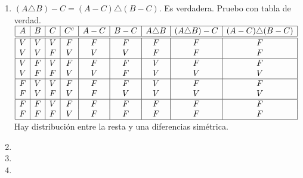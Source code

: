 \begin{enumerate}[label=\roman*)]
  \item $(A \triangle B) - C = (A-C) \triangle (B - C)$. Es verdadera. Pruebo con tabla de verdad.\\
        $
          \begin{array}{|c|c|c|c|c|c|c|c|c|}
            \hline
            A & B & C & C^c & A - C & B - C & A \triangle B & (A \triangle B) - C & (A - C) \triangle (B - C) \\
            \hline  \hline
            V & V & V & F   & F     & F     & F             & F                   & F                         \\
            V & V & F & V   & V     & V     & F             & F                   & F                         \\
            \hline
            V & F & V & F   & F     & F     & V             & F                   & F                         \\
            V & F & F & V   & V     & F     & V             & V                   & V                         \\
            \hline
            F & V & V & F   & F     & F     & V             & F                   & F                         \\
            F & V & F & V   & F     & V     & V             & V                   & V                         \\
            \hline
            F & F & V & F   & F     & F     & F             & F                   & F                         \\
            F & F & F & V   & F     & F     & F             & F                   & F                         \\
            \hline
          \end{array}
        $\\
        Hay distribución entre la resta y una diferencias simétrica.

\item \hacer
\item {}
\item {}
\end{enumerate}
